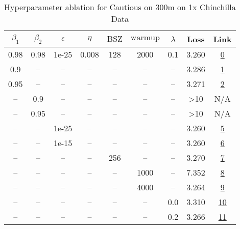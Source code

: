 \begin{table}[H]
\centering
\caption{Hyperparameter ablation for Cautious on 300m on 1x Chinchilla Data}
\label{tab:ablation_cautious_300m_1}
\begin{tabular}{ccccccccc}
\toprule
$\beta_1$ & $\beta_2$ & $\epsilon$ & $\eta$ & $\mathrm{BSZ}$ & $\mathrm{warmup}$ & $\lambda$ & Loss & Link \\
\midrule
0.98 & 0.98 & 1e-25 & 0.008 & 128 & 2000 & 0.1 & 3.260 & \href{https://wandb.ai/stanford-mercury/optimizer-scaling/runs/sweep-300m-6B-cautiousc8346clr0.008-wd0.1-minlr0-warmup2000-b10.-852297}{0} \\
\midrule
0.9 & -- & -- & -- & -- & -- & -- & 3.286 & \href{https://wandb.ai/stanford-mercury/optimizer-scaling/runs/sweep-300m-6B-cautiousfed852lr0.008-wd0.1-minlr0-warmup2000-b10.-4b06ef}{1} \\
0.95 & -- & -- & -- & -- & -- & -- & 3.271 & \href{https://wandb.ai/stanford-mercury/optimizer-scaling/runs/sweep-300m-6B-cautious7244dblr0.008-wd0.1-minlr0-warmup2000-b10.-5fd975}{2} \\
-- & 0.9 & -- & -- & -- & -- & -- & >10 & N/A \\
-- & 0.95 & -- & -- & -- & -- & -- & >10 & N/A \\
-- & -- & 1e-25 & -- & -- & -- & -- & 3.260 & \href{https://wandb.ai/stanford-mercury/optimizer-scaling/runs/sweep-300m-6B-cautiousc8346clr0.008-wd0.1-minlr0-warmup2000-b10.-852297}{5} \\
-- & -- & 1e-15 & -- & -- & -- & -- & 3.260 & \href{https://wandb.ai/stanford-mercury/optimizer-scaling/runs/sweep-300m-6B-cautious56bf47lr0.008-wd0.1-minlr0-warmup2000-b10.-19a98d}{6} \\
-- & -- & -- & -- & 256 & -- & -- & 3.270 & \href{https://wandb.ai/stanford-mercury/optimizer-scaling/runs/sweep-300m-6B-cautiousad730alr0.008-wd0.1-minlr0-warmup2000-b10.-315f4b}{7} \\
-- & -- & -- & -- & -- & 1000 & -- & 7.352 & \href{https://wandb.ai/stanford-mercury/optimizer-scaling/runs/sweep-300m-6B-cautiousc544aalr0.008-wd0.1-minlr0-warmup1000-b10.-0836a5}{8} \\
-- & -- & -- & -- & -- & 4000 & -- & 3.264 & \href{https://wandb.ai/stanford-mercury/optimizer-scaling/runs/sweep-300m-6B-cautious71139elr0.008-wd0.1-minlr0-warmup4000-b10.-6dedda}{9} \\
-- & -- & -- & -- & -- & -- & 0.0 & 3.310 & \href{https://wandb.ai/stanford-mercury/optimizer-scaling/runs/sweep-300m-6B-cautiousb3e078lr0.008-wd0-minlr0-warmup2000-b10.98-838b4c}{10} \\
-- & -- & -- & -- & -- & -- & 0.2 & 3.266 & \href{https://wandb.ai/stanford-mercury/optimizer-scaling/runs/sweep-300m-6B-cautious732329lr0.008-wd0.2-minlr0-warmup2000-b10.-3827e5}{11} \\
\bottomrule
\end{tabular}
\end{table}

